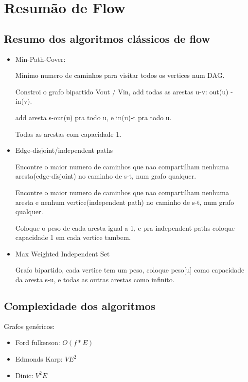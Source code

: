 \documentclass[12pt,a4paper,twoside]{report}
\begin{document}
\section{Resumão de Flow}

\subsection{Resumo dos algoritmos clássicos de flow}

\begin{itemize}
  \item Min-Path-Cover:

  Minimo numero de caminhos para visitar todos os vertices num DAG.
  
  Constroi o grafo bipartido Vout / Vin, add todas as arestas u-v: out(u) - in(v).
  
  add aresta s-out(u) pra todo u, e in(u)-t pra todo u.
  
  Todas as arestas com capacidade 1.

  \item Edge-disjoint/independent paths

  Encontre o maior numero de caminhos que nao compartilham nenhuma aresta(edge-disjoint) no caminho de s-t, num grafo qualquer.
  
  Encontre o maior numero de caminhos que nao compartilham nenhuma aresta e nenhum vertice(independent path) no caminho de s-t, num grafo qualquer.
  
  Coloque o peso de cada aresta igual a 1, e pra independent paths coloque capacidade 1 em cada vertice tambem.

  \item Max Weighted Independent Set

  Grafo bipartido, cada vertice tem um peso, coloque peso[u] como capacidade da aresta s-u, e todas as outras arestas como infinito.
\end{itemize}

\subsection {Complexidade dos algoritmos}
Grafos genéricos:
\begin{itemize}
  \item Ford fulkerson: $O(f*E)$
  \item Edmonds Karp: $VE^2$
  \item Dinic: $V^2E$
\end{itemize}
\end{document}
